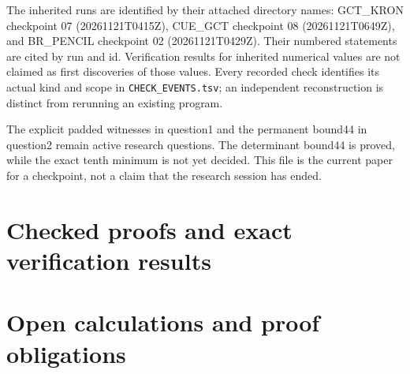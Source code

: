 \documentclass[11pt]{article}
\begin{document}
The inherited runs are identified by their attached directory names:
GCT\_KRON checkpoint 07 (20261121T0415Z), CUE\_GCT checkpoint 08
(20261121T0649Z), and BR\_PENCIL checkpoint 02 (20261121T0429Z).
Their numbered statements are cited by run and id. Verification results
for inherited numerical values are not claimed as first discoveries of
those values. Every recorded check identifies its actual kind and scope
in \texttt{CHECK\_EVENTS.tsv}; an independent reconstruction is distinct
from rerunning an existing program.

The explicit padded witnesses in question1 and the permanent bound44
in question2 remain active research questions. The determinant bound44
is proved, while the exact tenth minimum is not yet decided.
This file is the current paper for a checkpoint, not a claim that the
research session has ended.

\part{Checked proofs and exact verification results}

























\part{Open calculations and proof obligations}
\end{document}
